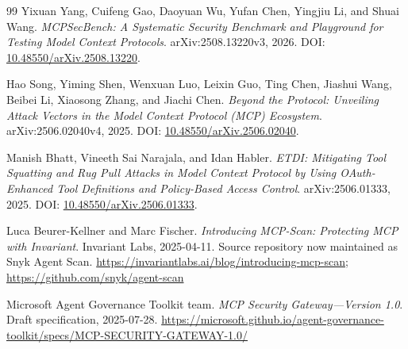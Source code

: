 \documentclass[11pt,letterpaper]{article}
\begin{document}
\begin{thebibliography}{99}
Yixuan Yang, Cuifeng Gao, Daoyuan Wu, Yufan Chen, Yingjiu Li, and Shuai Wang. \emph{MCPSecBench: A Systematic Security Benchmark and Playground for Testing Model Context Protocols}. arXiv:2508.13220v3, 2026. DOI: \href{https://doi.org/10.48550/arXiv.2508.13220}{10.48550/arXiv.2508.13220}.

Hao Song, Yiming Shen, Wenxuan Luo, Leixin Guo, Ting Chen, Jiashui Wang, Beibei Li, Xiaosong Zhang, and Jiachi Chen. \emph{Beyond the Protocol: Unveiling Attack Vectors in the Model Context Protocol (MCP) Ecosystem}. arXiv:2506.02040v4, 2025. DOI: \href{https://doi.org/10.48550/arXiv.2506.02040}{10.48550/arXiv.2506.02040}.

Manish Bhatt, Vineeth Sai Narajala, and Idan Habler. \emph{ETDI: Mitigating Tool Squatting and Rug Pull Attacks in Model Context Protocol by Using OAuth-Enhanced Tool Definitions and Policy-Based Access Control}. arXiv:2506.01333, 2025. DOI: \href{https://doi.org/10.48550/arXiv.2506.01333}{10.48550/arXiv.2506.01333}.

Luca Beurer-Kellner and Marc Fischer. \emph{Introducing MCP-Scan: Protecting MCP with Invariant}. Invariant Labs, 2025-04-11. Source repository now maintained as Snyk Agent Scan.
\url{https://invariantlabs.ai/blog/introducing-mcp-scan}; \url{https://github.com/snyk/agent-scan}

Microsoft Agent Governance Toolkit team. \emph{MCP Security Gateway---Version 1.0}. Draft specification, 2025-07-28.
\url{https://microsoft.github.io/agent-governance-toolkit/specs/MCP-SECURITY-GATEWAY-1.0/}

\end{thebibliography}
\end{document}
